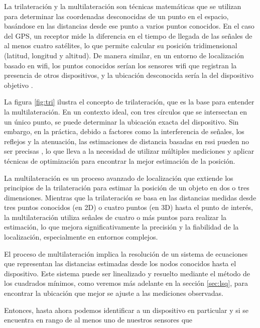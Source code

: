La trilateración y la multilateración son técnicas matemáticas que se utilizan para determinar las coordenadas desconocidas de un punto en el espacio, basándose en las distancias desde ese punto a varios puntos conocidos. En el caso del GPS, un receptor mide la diferencia en el tiempo de llegada de las señales de al menos cuatro satélites, lo que permite calcular su posición tridimensional (latitud, longitud y altitud). De manera similar, en un entorno de localización basado en \acs{wifi}, los puntos conocidos serían los sensores \acs{wifi} que registran la presencia de otros dispositivos, y la ubicación desconocida sería la del dispositivo objetivo \cite{bulusu2000gps}.

La figura \ref{fig:tri} ilustra el concepto de trilateración, que es la base para entender la multilateración. En un contexto ideal, con tres círculos que se intersectan en un único punto, se puede determinar la ubicación exacta del dispositivo. Sin embargo, en la práctica, debido a factores como la interferencia de señales, los reflejos y la atenuación, las estimaciones de distancia basadas en \acs{rssi} pueden no ser precisas \cite{rappaport2002wireless}, lo que lleva a la necesidad de utilizar múltiples mediciones y aplicar técnicas de optimización para encontrar la mejor estimación de la posición\cite{ouyang2010received}\cite{li2012kalman}.

La multilateración es un proceso avanzado de localización que extiende los principios de la trilateración para estimar la posición de un objeto en dos o tres dimensiones. Mientras que la trilateración se basa en las distancias medidas desde tres puntos conocidos (en 2D) o cuatro puntos (en 3D) hasta el punto de interés, la multilateración utiliza señales de cuatro o más puntos para realizar la estimación, lo que mejora significativamente la precisión y la fiabilidad de la localización, especialmente en entornos complejos.

El proceso de multilateración implica la resolución de un sistema de ecuaciones que representan las distancias estimadas desde los nodos conocidos hasta el dispositivo. Este sistema puede ser linealizado y resuelto mediante el método de los cuadrados mínimos, como veremos más adelante en la sección \ref{sec:lsq}, para encontrar la ubicación que mejor se ajuste a las mediciones observadas. 

Entonces, hasta ahora podemos identificar a un dispositivo en particular y si se encuentra en rango de al menos uno de nuestros sensores que 

